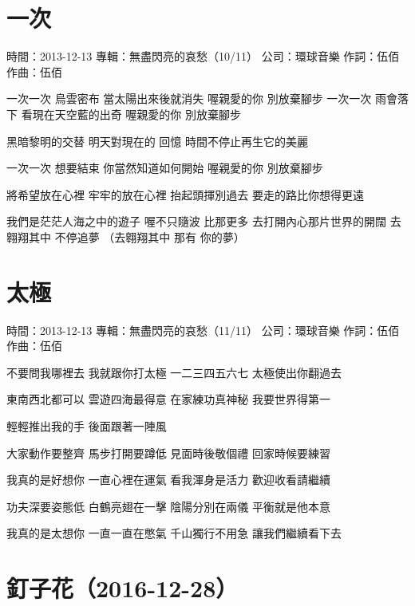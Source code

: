 \documentclass[UTF8,a4paper,oneside,twocolumn,12pt]{ctexbook}
\newcommand{\infopair}[2]{\textbullet #1：#2}
\newcommand{\zc}[1][伍佰]{\infopair{作詞}{#1}}
\newcommand{\zq}[1][伍佰]{\infopair{作曲}{#1}}
\newcommand{\zj}[1]{\infopair{專輯}{#1}}
\newcommand{\sj}[1]{\infopair{時間}{#1}}
\newcommand{\gs}[1]{\infopair{公司}{#1}}
\newenvironment{info}{\begin{flushleft}\kaishu
	}
	{\end{flushleft}\normalsize\yahei\par}
\newenvironment{lyric}{
	}
{}
\begin{document}
\section{一次}
\begin{info}
	\sj{2013-12-13}
	\zj{無盡閃亮的哀愁（10/11）}
	\gs{環球音樂}
	\zc
	\zq
\end{info}
\begin{lyric}
	一次一次 烏雲密布 當太陽出來後就消失
	喔親愛的你 別放棄腳步
	一次一次 雨會落下 看現在天空藍的出奇
	喔親愛的你 別放棄腳步

	黑暗黎明的交替 明天對現在的 回憶
	時間不停止再生它的美麗

	一次一次 想要結束 你當然知道如何開始
	喔親愛的你 別放棄腳步

	將希望放在心裡 牢牢的放在心裡
	抬起頭揮別過去 要走的路比你想得更遠

	我們是茫茫人海之中的遊子
	喔不只隨波 比那更多
	去打開內心那片世界的開闊
	去翱翔其中 不停追夢
	（去翱翔其中 那有 你的夢）
\end{lyric}

\section{太極}
\begin{info}
	\sj{2013-12-13}
	\zj{無盡閃亮的哀愁（11/11）}
	\gs{環球音樂}
	\zc
	\zq
\end{info}
\begin{lyric}
	不要問我哪裡去 我就跟你打太極
	一二三四五六七 太極使出你翻過去

	東南西北都可以 雲遊四海最得意
	在家練功真神秘 我要世界得第一

	輕輕推出我的手 後面跟著一陣風

	大家動作要整齊 馬步打開要蹲低
	見面時後敬個禮 回家時候要練習

	我真的是好想你 一直心裡在運氣
	看我渾身是活力 歡迎收看請繼續

	功夫深要姿態低 白鶴亮翅在一擊
	陰陽分別在兩儀 平衡就是他本意

	我真的是太想你 一直一直在憋氣
	千山獨行不用急 讓我們繼續看下去
\end{lyric}

\section*{釘子花（2016-12-28）}
\end{document}
